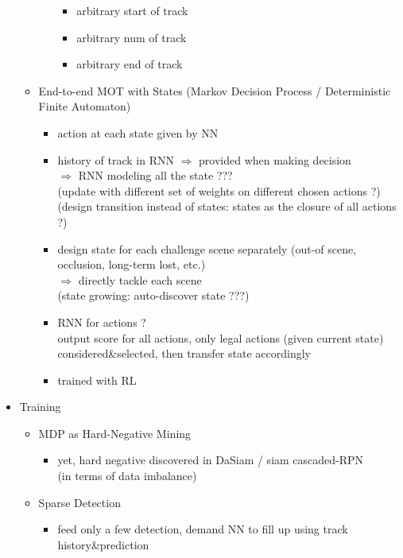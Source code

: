 \begin{itemize}
\begin{itemize}
\begin{itemize}
\begin{itemize}
			\item arbitrary start of track
			\item arbitrary num of track
			\item arbitrary end of track
			\end{itemize}
		\end{itemize}
	\item End-to-end MOT with States (Markov Decision Process / Deterministic Finite Automaton)
		\begin{itemize}
		\item action at each state given by NN
		\item history of track in RNN $\Rightarrow$ provided when making decision \\
		$\Rightarrow$ RNN modeling all the state ??? \\ 
		(update with different set of weights on different chosen actions ?) \\
		(design transition instead of states: states as the closure of all actions ?)
		\item design state for each challenge scene separately (out-of scene, occlusion, long-term lost, etc.) \\
		$\Rightarrow$ directly tackle each scene \\
		(state growing: auto-discover state ???)
		\item RNN for actions ? \\
		output score for all actions, only legal actions (given current state) considered\&selected, then transfer state accordingly
		\item trained with RL
		\end{itemize}
	\end{itemize}
\item Training
	\begin{itemize}
	\item MDP as Hard-Negative Mining \\
		\begin{itemize}
		\item yet, hard negative discovered in DaSiam / siam cascaded-RPN \\
		(in terms of data imbalance)
		\end{itemize}
	\item Sparse Detection
		\begin{itemize}
		\item feed only a few detection, demand NN to fill up using track history\&prediction
		\end{itemize}

\end{itemize}
\end{itemize}
